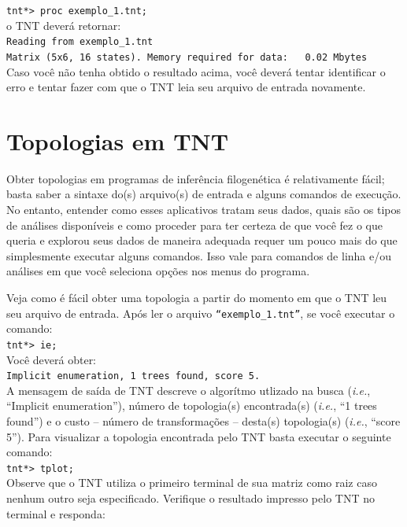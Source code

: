 \begin{refsection}
\indent\indent\texttt{tnt*> proc exemplo\_1.tnt;}\\

o TNT deverá retornar:
\\
\indent\indent\texttt{Reading from exemplo\_1.tnt}\\
\indent\indent\texttt{Matrix (5x6, 16 states). Memory required for data:~~~0.02 Mbytes}\\

Caso você não tenha obtido o resultado acima, você deverá tentar identificar o erro e tentar  fazer com que o TNT leia seu arquivo de entrada novamente.

\section{Topologias em TNT}\label{tut4:input}
Obter topologias em programas de inferência filogenética é relativamente fácil; basta saber a sintaxe do(s) arquivo(s) de entrada e alguns comandos de execução. No entanto, entender como esses aplicativos tratam seus dados, quais são os tipos de análises disponíveis e como proceder para ter certeza de que você fez o que queria e explorou seus dados de maneira adequada requer um pouco mais do que simplesmente executar alguns comandos. Isso vale para comandos de linha e/ou análises em que você seleciona opções nos menus do programa.

Veja como é fácil obter uma topologia a partir do momento em que o TNT leu seu arquivo de entrada. Após ler o arquivo \texttt{``exemplo\_1.tnt''}, se você executar o  comando:\\

\indent\indent\texttt{tnt*> ie;}\\

Você deverá obter:
\\
\indent\indent\texttt{Implicit enumeration, 1 trees found, score 5.}\\

A mensagem de saída de TNT descreve o algorítmo utlizado na busca (\textit{i.e.}, ``Implicit enumeration''), número de topologia(s) encontrada(s) (\textit{i.e.}, ``1 trees found'') e o custo -- número de transformações -- desta(s) topologia(s) (\textit{i.e.}, ``score 5''). Para visualizar a topologia encontrada pelo TNT basta executar o seguinte comando:\\

\indent\indent\texttt{tnt*> tplot;}\\

Observe que o TNT utiliza o primeiro terminal de sua matriz como raiz caso nenhum outro seja especificado. Verifique o resultado impresso pelo TNT no terminal e responda:



\end{refsection}
